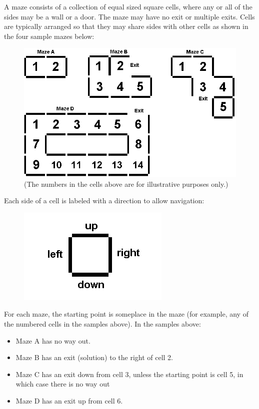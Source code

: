 
A maze consists of a collection of equal sized square cells, where any or all of the sides may be a
wall or a door. The maze may have no exit or multiple exits. Cells are typically arranged so that they
may share sides with other cells as shown in the four sample mazes below:

\begin{figure}[!h]
\begin{center}
    \includegraphics[width=.6\textwidth]{amazing-001.png}
    \caption{(The numbers in the cells above are for illustrative purposes only.)}
\end{center}
\end{figure}

Each side of a cell is labeled with a direction to allow navigation:

\begin{figure}[!h]
\begin{center}
    \includegraphics[width=.2\textwidth]{amazing-002.png}
\end{center}
\end{figure}

For each maze, the starting point is someplace in the maze (for example, any of the numbered cells
in the samples above). In the samples above:

\begin{itemize}
\item Maze A has no way out.
\item Maze B has an exit (solution) to the right of cell 2.
\item Maze C has an exit down from cell 3, unless the starting point is cell 5, in which case there is no way out
\item Maze D has an exit up from cell 6.
\end{itemize}

